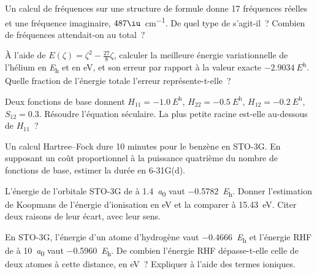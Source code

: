 \begin{exercise}[$\star$]\label{exo:b3:computational-chemistry:4}
Un calcul de fréquences sur une structure de formule  donne 17
fréquences réelles et une fréquence imaginaire, $487\iu$~\unit{cm^{-1}}.
De quel type de  s'agit-il~? Combien de fréquences
attendait-on au total~?
\end{exercise}

\begin{exercise}[$\star\star$]\label{exo:b3:computational-chemistry:5}
À l'aide de $E(\zeta) = \zeta^2 - \frac{27}{8}\zeta$, calculer la
meilleure énergie variationnelle de l'hélium en \unit{\hartree} et en eV,
et son erreur par rapport à la valeur exacte
$\qty{-2.9034}{\hartree}$. Quelle fraction de l'énergie totale
l'erreur représente-t-elle~?
\end{exercise}

\begin{exercise}[$\star\star$]\label{exo:b3:computational-chemistry:6}
Deux fonctions de base donnent $H_{11} = \qty{-1.0}{\hartree}$, $H_{22} =
\qty{-0.5}{\hartree}$, $H_{12} = \qty{-0.2}{\hartree}$, $S_{12} = 0.3$.
Résoudre l'équation séculaire. La plus petite racine est-elle
au-dessous de $H_{11}$~?
\end{exercise}

\begin{exercise}[$\star\star$]\label{exo:b3:computational-chemistry:7}
Un calcul Hartree--Fock dure 10 minutes pour le benzène en STO-3G. En
supposant un coût proportionnel à la puissance quatrième du nombre de
fonctions de base, estimer la durée en 6-31G(d).
\end{exercise}

\begin{exercise}[$\star\star$]\label{exo:b3:computational-chemistry:8}
L'énergie de l'orbitale STO-3G de  à \qty{1.4}{\bohr} vaut
\qty{-0.5782}{\hartree}. Donner l'estimation de Koopmans de l'énergie
d'ionisation en eV et la comparer à \qty{15.43}{eV}. Citer deux raisons
de leur écart, avec leur sens.
\end{exercise}

\begin{exercise}[$\star\star$]\label{exo:b3:computational-chemistry:9}
En STO-3G, l'énergie d'un atome d'hydrogène vaut \qty{-0.4666}{\hartree}
et l'énergie RHF de  à \qty{10}{\bohr} vaut \qty{-0.5960}{\hartree}.
De combien l'énergie RHF dépasse-t-elle celle de deux atomes à cette
distance, en eV~? Expliquer à l'aide des termes ioniques.
\end{exercise}

